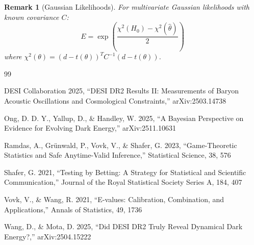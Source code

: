 \documentclass[11pt,a4paper]{article}
\newtheorem{remark}{Remark}
\begin{document}
\begin{remark}[Gaussian Likelihoods]
For multivariate Gaussian likelihoods with known covariance $C$:
\begin{equation}
E = \exp\left(\frac{\chi^2(H_0) - \chi^2(\hat{\theta})}{2}\right)
\end{equation}
where $\chi^2(\theta) = (d - t(\theta))^T C^{-1} (d - t(\theta))$.
\end{remark}


\begin{thebibliography}{99}

DESI Collaboration 2025, ``DESI DR2 Results II: Measurements of Baryon Acoustic Oscillations and Cosmological Constraints,'' arXiv:2503.14738

Ong, D. D. Y., Yallup, D., \& Handley, W. 2025, ``A Bayesian Perspective on Evidence for Evolving Dark Energy,'' arXiv:2511.10631

Ramdas, A., Gr{\"u}nwald, P., Vovk, V., \& Shafer, G. 2023, ``Game-Theoretic Statistics and Safe Anytime-Valid Inference,'' Statistical Science, 38, 576

Shafer, G. 2021, ``Testing by Betting: A Strategy for Statistical and Scientific Communication,'' Journal of the Royal Statistical Society Series A, 184, 407

Vovk, V., \& Wang, R. 2021, ``E-values: Calibration, Combination, and Applications,'' Annals of Statistics, 49, 1736

Wang, D., \& Mota, D. 2025, ``Did DESI DR2 Truly Reveal Dynamical Dark Energy?,'' arXiv:2504.15222

\end{thebibliography}
\end{document}
